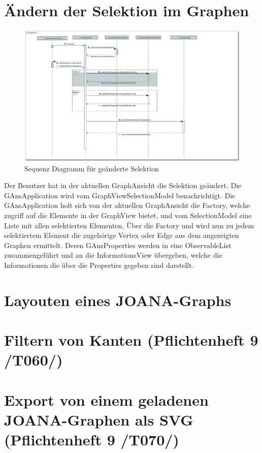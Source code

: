 \newpage

\section{Ändern der Selektion im Graphen}

\begin{figure}[!htbp]
	\centering
	\includegraphics[width=450pt]{resourcen/SeqDiagramSelection.PDF}
	\caption{Sequenz Diagramm für geänderte Selektion}
	\label{fig:seq:selection}
\end{figure}

Der Benutzer hat in der aktuellen GraphAnsicht die Selektion geändert. Die GAnsApplication wird vom GraphViewSelectionModel benachrichtigt. Die GAnsApplication holt sich von der aktuellen GraphAnsicht die Factory, welche zugriff auf die Elemente in der GraphView bietet, und vom SelectionModel eine Liste mit allen selektierten Elementen. Über die Factory und wird nun zu jedem selektiertem Element die zugehörige Vertex oder Edge aus dem angezeigten Graphen ermittelt. Deren GAnsProperties werden in eine ObservableList zusammengeführt und an die InformationsView übergeben, welche die Informationen die über die Properties gegeben sind darstellt.

\newpage

\section{Layouten eines JOANA-Graphs}
\newpage
\section{Filtern von Kanten (Pflichtenheft 9 /T060/)}
\newpage
\section{Export von einem geladenen JOANA-Graphen als SVG (Pflichtenheft 9 /T070/)}